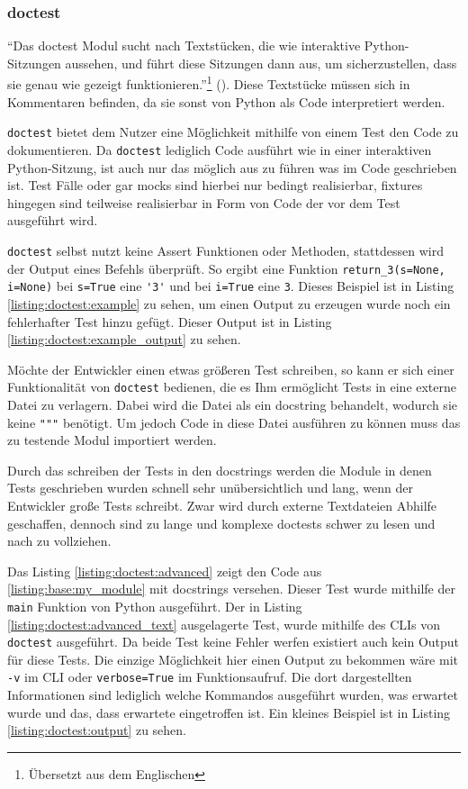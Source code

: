 \subsubsection{doctest}\label{python-tools:doctest}

"`Das doctest Modul sucht nach Textstücken, die wie interaktive Python-Sitzungen
aussehen, und führt diese Sitzungen dann aus, um sicherzustellen, dass sie genau
wie gezeigt funktionieren."'\footnote{Übersetzt aus dem Englischen}
(\cite{docs.python:doctest}). Diese Textstücke müssen sich in Kommentaren
befinden, da sie sonst von Python als Code interpretiert werden.

\lstinline{doctest} bietet dem Nutzer eine Möglichkeit mithilfe von einem Test
den Code zu dokumentieren. Da \lstinline{doctest} lediglich Code ausführt wie in
einer interaktiven Python-Sitzung, ist auch nur das möglich aus zu führen was im
Code geschrieben ist. Test Fälle oder gar \Glspl{mock} sind hierbei nur bedingt
realisierbar, \Glspl{fixture} hingegen sind teilweise realisierbar in Form von
Code der vor dem Test ausgeführt wird.

\lstinline{doctest} selbst nutzt keine Assert Funktionen oder Methoden,
stattdessen wird der Output eines Befehls überprüft. So ergibt eine Funktion
\lstinline{return_3(s=None, i=None)} bei \lstinline{s=True} eine \lstinline{'3'}
und bei \lstinline{i=True} eine \lstinline{3}. Dieses Beispiel ist in Listing
\ref{listing:doctest:example} zu sehen, um einen Output zu erzeugen wurde noch
ein fehlerhafter Test hinzu gefügt. Dieser Output ist in Listing
\ref{listing:doctest:example_output} zu sehen.

Möchte der Entwickler einen etwas größeren Test schreiben, so kann er sich einer
Funktionalität von \lstinline{doctest} bedienen, die es Ihm ermöglicht Tests in
eine externe Datei zu verlagern. Dabei wird die Datei als ein \Gls{docstring}
behandelt, wodurch sie keine \lstinline{"""} benötigt. Um jedoch Code in diese
Datei ausführen zu können muss das zu testende Modul importiert werden.

Durch das schreiben der Tests in den \Glspl{docstring} werden die Module in
denen Tests geschrieben wurden schnell sehr unübersichtlich und lang, wenn der
Entwickler große Tests schreibt. Zwar wird durch externe Textdateien Abhilfe
geschaffen, dennoch sind zu lange und komplexe doctests schwer zu lesen und
nach zu vollziehen.
\newline

Das Listing \ref{listing:doctest:advanced} zeigt den Code aus
\ref{listing:base:my_module} mit \Glspl{docstring} versehen. Dieser Test wurde
mithilfe der \lstinline{main} Funktion von Python ausgeführt. Der in Listing
\ref{listing:doctest:advanced_text} ausgelagerte Test, wurde mithilfe des CLIs
von \lstinline{doctest} ausgeführt. Da beide Test keine Fehler werfen existiert
auch kein Output für diese Tests.
Die einzige Möglichkeit hier einen Output zu bekommen wäre mit \lstinline{-v} im
CLI oder \lstinline{verbose=True} im Funktionsaufruf. Die dort dargestellten
Informationen sind lediglich welche Kommandos ausgeführt wurden, was erwartet
wurde und das, dass erwartete eingetroffen ist. Ein kleines Beispiel ist in
Listing \ref{listing:doctest:output} zu sehen.


